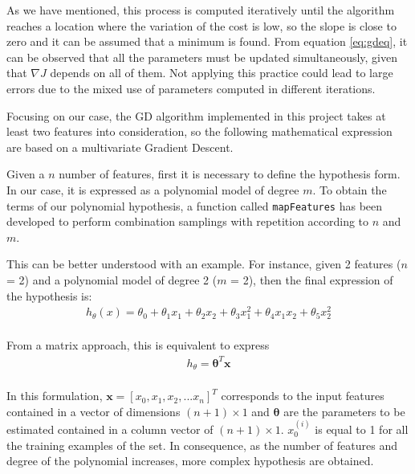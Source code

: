 \documentclass[a4paper, report, oneside, UKenglish]{memoir}
\newcommand{\x}{\boldsymbol{x}}
\newcommand{\btheta}{\boldsymbol{\theta}}
\begin{document}
As we have mentioned, this process is computed iteratively until the algorithm reaches a location where the variation of the cost is low, so the slope is close to zero and it can be assumed that a minimum is found. From equation \eqref{eq:gdeq}, it can be observed that all the parameters must be updated simultaneously, given that $\nabla J$ depends on all of them. Not applying this practice could lead to large errors due to the mixed use of parameters computed in different iterations. 

Focusing on our case, the GD algorithm implemented in this project takes at least two features into consideration, so the following mathematical expression are based on a multivariate Gradient Descent.  

Given a $n$ number of features, first it is necessary to define the hypothesis form. In our case, it is expressed as a polynomial model of degree $m$. To obtain the terms of our polynomial hypothesis, a function called \texttt{mapFeatures}  has been developed to perform combination samplings with repetition according to $n$ and $m$. 

This can be better understood with an example. For instance, given 2 features ($n$ = 2) and a polynomial model of degree 2 ($m$ = 2), then the final expression of the hypothesis is:
\begin{equation}\label{eq:gdH}
\begin{split}
    h_{\theta}(x) = \theta_{0} + \theta_{1}x_{1} + \theta_{2}x_{2} + \theta_{3}x^{2}_{1} + \theta_{4}x_{1}x_{2} + \theta_{5}x^{2}_{2}\\
\end{split}
\end{equation}

From a matrix approach, this is equivalent to express
\begin{equation}\label{eq:gdHmatrix}
\begin{split}
    h_{\theta} = \btheta^{T}\x\\
\end{split}
\end{equation}

In this formulation, $\x = [x_0,x_1, x_2,...x_n]^{T}$ corresponds to the input features contained in a vector of dimensions $(n+1)\times 1$ and $\btheta$ are the parameters to be estimated contained in a column vector of $(n+1)\times 1$. $x_0^{(i)}$ is equal to 1 for all the training examples of the set. In consequence, as the number of features and degree of the polynomial increases, more complex hypothesis are obtained.  
\end{document}
